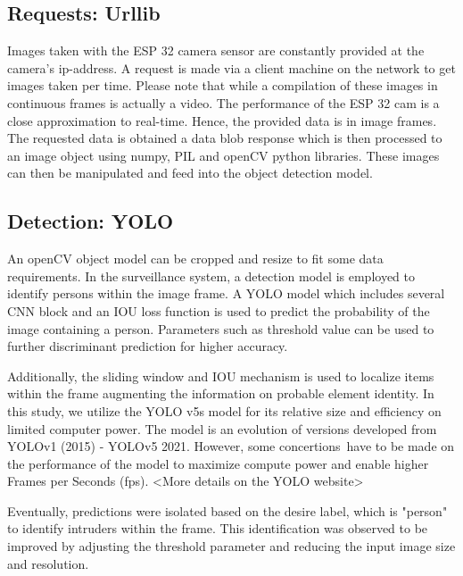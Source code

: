 \documentclass[../../main.tex]{subfiles}
\begin{document}
                \subsection{Requests: Urllib}
                    Images taken with the ESP 32 camera sensor are constantly provided at the camera's ip-address. A request is made via a client machine on the network to get images taken per time. Please note that while a compilation of these images in continuous frames is actually a video. The performance of the ESP 32 cam is a close approximation to real-time. Hence, the provided data is in image frames. The requested data is obtained a data blob response which is then processed to an image object using numpy, PIL and openCV python libraries. These images can then be manipulated and feed into the object detection model.
                
                \subsection{Detection: YOLO}
                    An openCV object model can be cropped and resize to fit some data requirements. In the surveillance system, a detection model is employed to identify persons within the image frame. A YOLO model which includes several CNN block and an IOU loss function is used to predict the probability of the image containing a person. Parameters such as threshold value can be used to further discriminant prediction for higher accuracy.

                    Additionally, the sliding window and IOU mechanism is used to localize items within the frame augmenting the information on probable element identity. In this study, we utilize the YOLO v5s model for its relative size and efficiency on limited computer power. The model is an evolution of versions developed from YOLOv1 (2015) - YOLOv5 2021. However, some concertions have to be made on the performance of the model to maximize compute power and enable higher Frames per Seconds (fps). <More details on the YOLO website>
                    
                    Eventually, predictions were isolated based on the desire label, which is "person" to identify intruders within the frame. This identification was observed to be improved by adjusting the threshold parameter and reducing the input image size and resolution.
                
\end{document}

